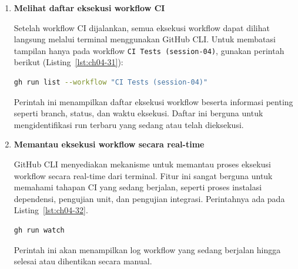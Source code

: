 \begin{enumerate}
Setelah workflow dijalankan, status dan hasil eksekusi dapat dipantau
langsung dari terminal menggunakan GitHub CLI. Daftar eksekusi workflow
ditampilkan dengan perintah berikut (Listing~\ref{lst:ch04-30}):

\begin{lstlisting}[language=bash, caption={Memantau workflow di GitHub (4)}, label={lst:ch04-30}]
gh run list
\end{lstlisting}

Perintah ini akan menampilkan informasi seperti nama workflow, branch,
status eksekusi, dan waktu eksekusi. Dengan demikian, proses CI/CD dapat
dipantau tanpa harus membuka antarmuka web GitHub.


  
  \item \textbf{Melihat daftar eksekusi workflow CI}

Setelah workflow CI dijalankan, semua eksekusi workflow dapat dilihat langsung
melalui terminal menggunakan GitHub CLI. Untuk membatasi tampilan hanya pada
workflow \texttt{CI Tests (session-04)}, gunakan perintah berikut (Listing~\ref{lst:ch04-31}):

\begin{lstlisting}[language=bash, caption={Memantau workflow di GitHub (5)}, label={lst:ch04-31}]
gh run list --workflow "CI Tests (session-04)"
\end{lstlisting}

Perintah ini menampilkan daftar eksekusi workflow beserta informasi penting
seperti branch, status, dan waktu eksekusi. Daftar ini berguna untuk
mengidentifikasi run terbaru yang sedang atau telah dieksekusi.

\item \textbf{Memantau eksekusi workflow secara real-time}

GitHub CLI menyediakan mekanisme untuk memantau proses eksekusi workflow
secara real-time dari terminal. Fitur ini sangat berguna untuk memahami
tahapan CI yang sedang berjalan, seperti proses instalasi dependensi,
pengujian unit, dan pengujian integrasi. Perintahnya ada pada Listing~\ref{lst:ch04-32}.

\begin{lstlisting}[language=bash, caption={Memantau workflow di GitHub (6)}, label={lst:ch04-32}]
gh run watch
\end{lstlisting}

Perintah ini akan menampilkan log workflow yang sedang berjalan hingga
selesai atau dihentikan secara manual.


\end{enumerate}
